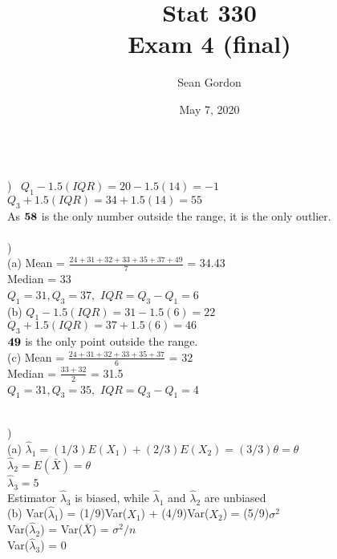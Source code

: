 \documentclass[12pt]{article}
\title{Stat 330\\Exam 4 (final)}
\author{Sean Gordon}
\date{May 7, 2020}
\begin{document}
\maketitle


\noindent\hrulefill \\


) \ $Q_1 - 1.5(IQR) = 20 - 1.5(14) = -1$\\
\indent  $Q_3 + 1.5(IQR) = 34 + 1.5(14) = 55$\\
\indent  As $\bf{58}$ is the only number outside the range, it is the only outlier.\\


\noindent \hrulefill \\


)\\
\indent(a) Mean = {\Large $\frac{24 + 31 + 32 + 33 + 35 + 37 + 49}{7}$} = 34.43\\
\indent \indent Median = 33\\
\indent \indent $Q_1 = 31, Q_3 = 37,$ \indent $IQR = Q_3 - Q_1 = 6$\\

\indent (b) $Q_1 - 1.5(IQR) = 31 - 1.5(6) = 22$\\
\indent \indent $Q_3 + 1.5(IQR) = 37 + 1.5(6) = 46$\\
\indent \indent $\bf{49}$ is the only point outside the range.\\

\indent (c) Mean = {\Large $\frac{24 + 31 + 32 + 33 + 35 + 37}{6}$} = 32\\
\indent \indent Median = {\Large $\frac{33 + 32}{2}$} = 31.5\\[.4em]
\indent \indent $Q_1 = 31, Q_3 = 35,$ \indent $IQR = Q_3 - Q_1 = 4$\\


\noindent \hrulefill \\
\pagebreak


) \\
\indent (a) $\hat{\lambda}_1 = (1/3)E(X_1) + (2/3)E(X_2) = (3/3)\theta = \theta$\\
\indent \indent $\hat{\lambda}_2 = E(\bar{X}) = \theta$\\
\indent \indent $\hat{\lambda}_3 = 5$\\
\indent \indent Estimator $\hat{\lambda}_3$ is biased, while $\hat{\lambda}_1$ and $\hat{\lambda}_2$ are unbiased\\

\indent (b) Var($\hat{\lambda}_1$) = (1/9)Var($X_1$) + (4/9)Var($X_2$) = (5/9)$\sigma^2$\\
\indent \indent Var($\hat{\lambda}_2$) = Var($\bar{X}$) = $\sigma^2/n$\\
\indent \indent Var($\hat{\lambda}_3$) = 0\\
\end{document}
